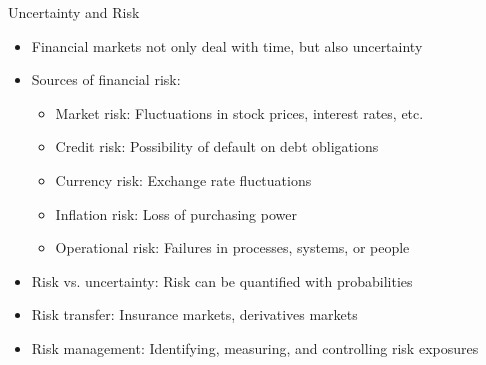 \documentclass[10pt,handout]{beamer}
\begin{document}
\begin{frame}{Uncertainty and Risk}
  \begin{itemize}[<+->]
    \item Financial markets not only deal with time, but also uncertainty
    \item Sources of financial risk:
      \begin{itemize}
        \item Market risk: Fluctuations in stock prices, interest rates, etc.
        \item Credit risk: Possibility of default on debt obligations
        \item Currency risk: Exchange rate fluctuations
        \item Inflation risk: Loss of purchasing power
        \item Operational risk: Failures in processes, systems, or people
      \end{itemize}
    \item Risk vs. uncertainty: Risk can be quantified with probabilities
    \item Risk transfer: Insurance markets, derivatives markets
    \item Risk management: Identifying, measuring, and controlling risk exposures
  \end{itemize}
\end{frame}

%      
%      
%      
\end{document}
